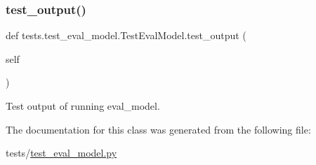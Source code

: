 \mbox{\label{classtests_1_1test__eval__model_1_1TestEvalModel_a899d6a41fb8f56be62a7145d9937ee52}} 
\subsubsection{\texorpdfstring{test\+\_\+output()}{test\_output()}}
{\footnotesize\ttfamily def tests.\+test\+\_\+eval\+\_\+model.\+Test\+Eval\+Model.\+test\+\_\+output (\begin{DoxyParamCaption}\item[{}]{self }\end{DoxyParamCaption})}

\begin{DoxyVerb}Test output of running eval_model.
\end{DoxyVerb}
 

The documentation for this class was generated from the following file\+:\begin{DoxyCompactItemize}
\item 
tests/\hyperlink{test__eval__model_8py}{test\+\_\+eval\+\_\+model.\+py}\end{DoxyCompactItemize}
